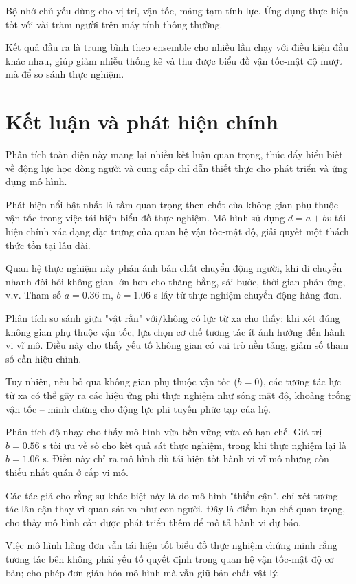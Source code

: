 \documentclass[12pt,a4paper]{article}
\begin{document}
Bộ nhớ chủ yếu dùng cho vị trí, vận tốc, mảng tạm tính lực. Ứng dụng thực hiện tốt với vài trăm người trên máy tính thông thường.

Kết quả đầu ra là trung bình theo ensemble cho nhiều lần chạy với điều kiện đầu khác nhau, giúp giảm nhiễu thống kê và thu được biểu đồ vận tốc-mật độ mượt mà để so sánh thực nghiệm.

\section{Kết luận và phát hiện chính}

Phân tích toàn diện này mang lại nhiều kết luận quan trọng, thúc đẩy hiểu biết về động lực học dòng người và cung cấp chỉ dẫn thiết thực cho phát triển và ứng dụng mô hình.

Phát hiện nổi bật nhất là tầm quan trọng then chốt của không gian phụ thuộc vận tốc trong việc tái hiện biểu đồ thực nghiệm. Mô hình sử dụng $d = a + bv$ tái hiện chính xác dạng đặc trưng của quan hệ vận tốc-mật độ, giải quyết một thách thức tồn tại lâu dài.

Quan hệ thực nghiệm này phản ánh bản chất chuyển động người, khi di chuyển nhanh đòi hỏi không gian lớn hơn cho thăng bằng, sải bước, thời gian phản ứng, v.v. Tham số $a = 0.36$ m, $b = 1.06$ s lấy từ thực nghiệm chuyển động hàng đơn.

Phân tích so sánh giữa "vật rắn" với/không có lực từ xa cho thấy: khi xét đúng không gian phụ thuộc vận tốc, lựa chọn cơ chế tương tác ít ảnh hưởng đến hành vi vĩ mô. Điều này cho thấy yếu tố không gian có vai trò nền tảng, giảm số tham số cần hiệu chỉnh.

Tuy nhiên, nếu bỏ qua không gian phụ thuộc vận tốc ($b = 0$), các tương tác lực từ xa có thể gây ra các hiệu ứng phi thực nghiệm như sóng mật độ, khoảng trống vận tốc – minh chứng cho động lực phi tuyến phức tạp của hệ.

Phân tích độ nhạy cho thấy mô hình vừa bền vững vừa có hạn chế. Giá trị $b = 0.56$ s tối ưu về số cho kết quả sát thực nghiệm, trong khi thực nghiệm lại là $b = 1.06$ s. Điều này chỉ ra mô hình dù tái hiện tốt hành vi vĩ mô nhưng còn thiếu nhất quán ở cấp vi mô.

Các tác giả cho rằng sự khác biệt này là do mô hình "thiển cận", chỉ xét tương tác lân cận thay vì quan sát xa như con người. Đây là điểm hạn chế quan trọng, cho thấy mô hình cần được phát triển thêm để mô tả hành vi dự báo.

Việc mô hình hàng đơn vẫn tái hiện tốt biểu đồ thực nghiệm chứng minh rằng tương tác bên không phải yếu tố quyết định trong quan hệ vận tốc-mật độ cơ bản; cho phép đơn giản hóa mô hình mà vẫn giữ bản chất vật lý.
\end{document}
